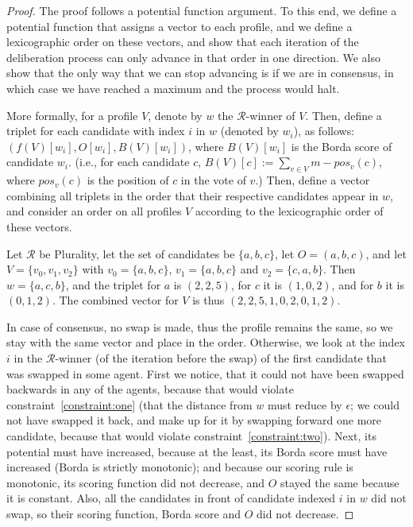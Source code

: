 \documentclass[runningheads,envcountsame]{llncs}
\begin{document}
\begin{proof}
%
The proof follows a potential function argument. To this end, we define a potential function that assigns a vector to each profile, and we define a lexicographic order on these vectors, and show that each iteration of the deliberation process can only advance in that order in one direction.
We also show that the only way that we can stop advancing is if we are in consensus, in which case we have reached a maximum and the process would halt.

More formally, for a profile $V$, denote by $w$ the $\mathcal{R}$-winner of $V$. Then, define a triplet for each candidate with index $i$ in $w$ (denoted by $w_i$), as follows: $(f(V)[w_i], O[w_i], B(V)[w_i])$, where $B(V)[w_i]$ is the Borda score of candidate $w_i$. (i.e., for each candidate $c$, $B(V)[c] := \sum_{v \in V} m - pos_v(c)$, where $pos_v(c)$ is the position of $c$ in the vote of $v$.) Then, define a vector combining all triplets in the order that their respective candidates appear in $w$, and consider an order on all profiles $V$ according to the lexicographic order of these vectors.

\begin{example}\label{example:intheproof}
%
Let $\mathcal{R}$ be Plurality, let the set of candidates be $\{a, b, c\}$, let $O = (a,b,c)$, and let $V = \{v_0, v_1, v_2\}$ with $v_0 = \{a, b, c\}$, $v_1 = \{a, b, c\}$ and $v_2 = \{c, a, b\}$. Then $w = \{a, c, b\}$, and the triplet for $a$ is $(2, 2, 5)$, for $c$ it is $(1, 0, 2)$, and for $b$ it is $(0, 1, 2)$. The combined vector for $V$ is thus $(2, 2, 5, 1, 0, 2, 0, 1, 2)$.
%
\end{example}

In case of consensus, no swap is made, thus the profile remains the same, so we stay with the same vector and place in the order.
Otherwise, we look at the index $i$ in the $\mathcal{R}$-winner (of the iteration before the swap) of the first candidate that was swapped in some agent. 
First we notice, that it could not have been swapped backwards in any of the agents, because that would violate constraint~\ref{constraint:one} (that the distance from $w$ must reduce by $\epsilon$; we could not have swapped it back, and make up for it by swapping forward one more candidate, because that would violate constraint~\ref{constraint:two}).
Next, its potential must have increased, because at the least, its Borda score must have increased (Borda is strictly monotonic); and because our scoring rule is monotonic, its scoring function did not decrease, and $O$ stayed the same because it is constant. Also, all the candidates in front of candidate indexed $i$ in $w$ did not swap, so their scoring function, Borda score and $O$ did not decrease.


\end{proof}
\end{document}
